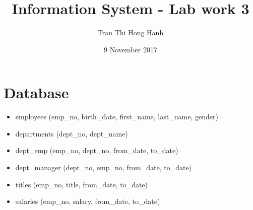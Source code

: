 \documentclass{article}
\title{Information System - Lab work 3}
\author{Tran Thi Hong Hanh}
\date{9 November 2017}
\begin{document}
\maketitle
\section*{Database}
\begin{itemize}
	\item employees (emp\_no, birth\_date, first\_name, last\_name, gender)
	\item departments (dept\_no, dept\_name)
	\item dept\_emp (emp\_no, dept\_no, from\_date, to\_date)
	\item dept\_manager (dept\_no, emp\_no, from\_date, to\_date)
	\item titles (emp\_no, title, from\_date, to\_date)
	\item salaries (emp\_no, salary, from\_date, to\_date)
\end{itemize}
\end{document}
